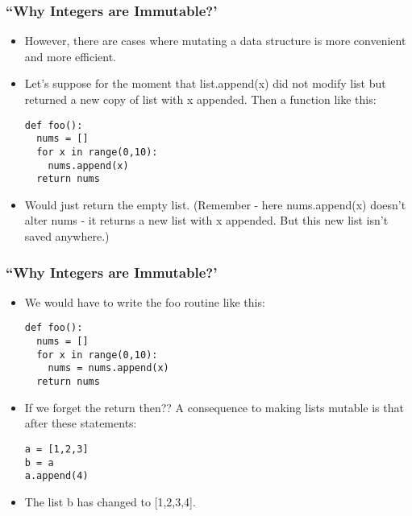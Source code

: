 \begin{frame}[fragile]\frametitle{``Why Integers are Immutable?' }
    \begin{itemize}
    \item However, there are cases where mutating a data structure is more convenient and more efficient. 
    \item Let's suppose for the moment that list.append(x) did not modify list but returned a new copy of list with x appended. Then a function like this:
        \begin{lstlisting}
def foo():
  nums = []
  for x in range(0,10):
    nums.append(x)
  return nums
\end{lstlisting}
\item Would just return the empty list. (Remember - here nums.append(x) doesn't alter nums - it returns a new list with x appended. But this new list isn't saved anywhere.)
            \end{itemize}
            
\end{frame}


\begin{frame}[fragile]\frametitle{``Why Integers are Immutable?' }
    \begin{itemize}
    \item We would have to write the foo routine like this:
        \begin{lstlisting}
def foo():
  nums = []
  for x in range(0,10):
    nums = nums.append(x)
  return nums
\end{lstlisting}
\item If we forget the return then?? A consequence to making lists mutable is that after these statements:
        \begin{lstlisting}
a = [1,2,3]
b = a
a.append(4)
\end{lstlisting}
\item The list b has changed to [1,2,3,4].
            \end{itemize}
            
\end{frame}

